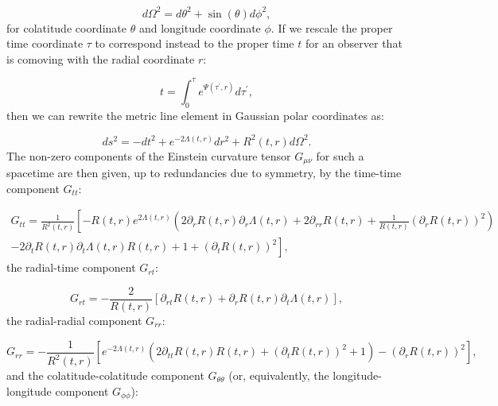 \documentclass{article}
\begin{document}
\begin{equation}
d \Omega^2 = d \theta^2 + \sin \left( \theta \right) d \phi^2,
\end{equation}
for colatitude coordinate ${\theta}$ and longitude coordinate ${\phi}$. If we rescale the proper time coordinate ${\tau}$ to correspond instead to the proper time $t$ for an observer that is comoving with the radial coordinate $r$:

\begin{equation}
t = \int_{0}^{\tau} e^{\Psi \left( \tau^{\prime}, r \right)} d \tau^{\prime},
\end{equation}
then we can rewrite the metric line element in Gaussian polar coordinates as:

\begin{equation}
ds^2 = -dt^2 + e^{- 2 \Lambda \left( t, r \right)} dr^2 + R^2 \left( t, r \right) d \Omega^2.
\end{equation}
The non-zero components of the Einstein curvature tensor ${G_{\mu \nu}}$ for such a spacetime are then given, up to redundancies due to symmetry, by the time-time component ${G_{t t}}$:

\begin{multline}
G_{t t} = \frac{1}{R^{2} \left( t, r \right)} \left[ - R \left( t, r \right) e^{2 \Lambda \left( t, r \right)} \left( 2 \partial_r R \left( t, r \right) \partial_r \Lambda \left( t, r \right) + 2 \partial_{r r} R \left( t, r \right) + \frac{1}{R \left( t, r \right)} \left( \partial_r R \left( t, r \right) \right)^2 \right) \right.\\
\left. - 2 \partial_t R \left( t, r \right) \partial_t \Lambda \left( t, r \right) R \left( t, r \right) + 1 + \left( \partial_t R \left( t, r \right) \right)^2 \right],
\end{multline}
the radial-time component ${G_{r t}}$:

\begin{equation}
G_{r t} = - \frac{2}{R \left( t, r \right)} \left[ \partial_{r t} R \left( t, r \right) + \partial_r R \left( t, r \right) \partial_t \Lambda \left( t, r \right) \right],
\end{equation}
the radial-radial component ${G_{r r}}$:

\begin{equation}
G_{r r} = - \frac{1}{R^{2} \left( t, r \right)} \left[ e^{-2 \Lambda \left( t, r \right)} \left( 2 \partial_{t t} R \left( t, r \right) R \left( t, r \right) + \left( \partial_t R \left( t, r \right) \right)^2 + 1 \right) - \left( \partial_r R \left( t, r \right) \right)^2 \right],
\end{equation}
and the colatitude-colatitude component ${G_{\theta \theta}}$ (or, equivalently, the longitude-longitude component ${G_{\phi \phi}}$):
\end{document}

